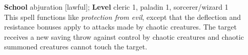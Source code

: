 \textbf{School} abjuration [lawful]; \textbf{Level} cleric 1, paladin 1, sorcerer/wizard 1\\
This spell functions like \textit{protection from evil}, except that the deflection and resistance bonuses apply to attacks made by chaotic creatures. The target receives a new saving throw against control by chaotic creatures and chaotic summoned creatures cannot touch the target.\\
